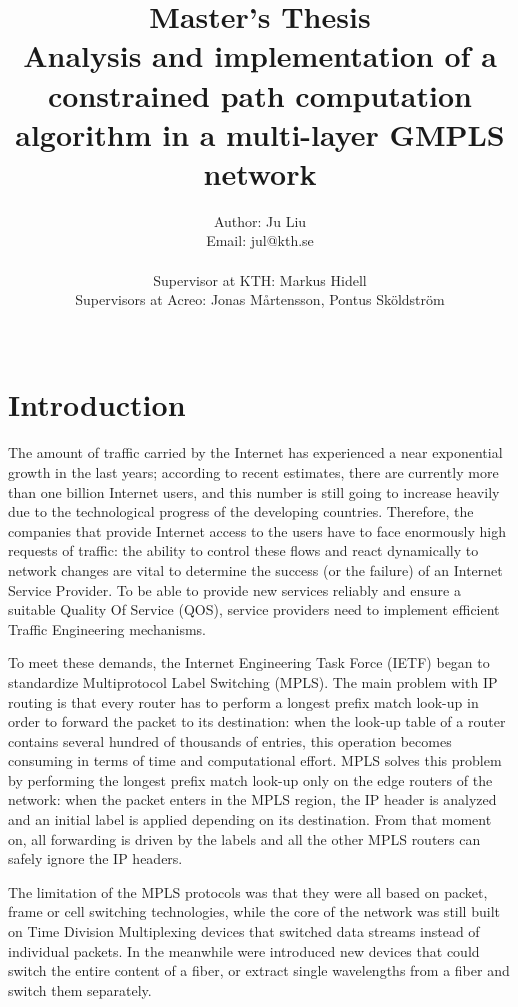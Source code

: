 \documentclass[10pt,a4paper]{report}
\author{Author: Ju Liu \\ Email: jul@kth.se \\\\
  Supervisor at KTH: Markus Hidell \\ Supervisors at Acreo: Jonas
  Mårtensson, Pontus Sköldström \\\\ }
\title{\textbf{Master's Thesis}
  \\Analysis and implementation of a constrained path
    computation algorithm in a multi-layer GMPLS network}
\begin{document}
\setlength{\parskip}{4ex}

\maketitle

\chapter{Introduction}
The amount of traffic carried by the Internet has experienced a near
exponential growth in the last years; according to recent estimates,
there are currently more than one billion Internet users, and this
number is still going to increase heavily due to the technological
progress of the developing countries. Therefore, the companies that
provide Internet access to the users have to face enormously high
requests of traffic: the ability to control these flows and react
dynamically to network changes are vital to determine the success (or
the failure) of an Internet Service Provider. To be able to provide
new services reliably and ensure a suitable Quality Of Service (QOS),
service providers need to implement efficient Traffic Engineering
mechanisms.

To meet these demands, the Internet Engineering Task Force (IETF)
began to standardize Multiprotocol Label Switching (MPLS). The main
problem with IP routing is that every router has to perform a longest
prefix match look-up in order to forward the packet to its
destination: when the look-up table of a router contains several
hundred of thousands of entries, this operation becomes consuming in
terms of time and computational effort. MPLS solves this problem by
performing the longest prefix match look-up only on the edge routers
of the network: when the packet enters in the MPLS region, the IP
header is analyzed and an initial label is applied depending on its
destination. From that moment on, all forwarding is driven by the
labels and all the other MPLS routers can safely ignore the IP
headers.

The limitation of the MPLS protocols was that they were all based on
packet, frame or cell switching technologies, while the core of the
network was still built on Time Division Multiplexing devices that
switched data streams instead of individual packets. In the meanwhile
were introduced new devices that could switch the entire content of a
fiber, or extract single wavelengths from a fiber and switch them
separately. 
\end{document}
